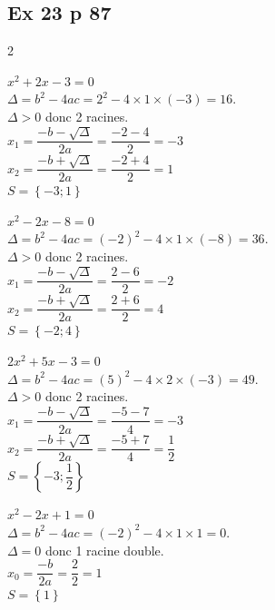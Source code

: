 \documentclass[12pt,a4paper]{book}
\begin{document}
\subsection*{Ex 23 p 87}
\begin{multicols}{2}
\begin{enumMet}
    \item $x^2+2x-3=0$\\
    $\Delta=b^2-4ac=2^2-4\times1\times(-3)=16$.\\
    $\Delta>0$ donc 2 racines.\\
    $x_1=\dfrac{-b-\sqrt{\Delta}}{2a}=\dfrac{-2-4}{2}=-3$\\
    $x_2=\dfrac{-b+\sqrt{\Delta}}{2a}=\dfrac{-2+4}{2}=1$\\
    $S=\left\{-3;1\right\}$
    \item $x^2-2x-8=0$\\
    $\Delta=b^2-4ac=(-2)^2-4\times1\times(-8)=36$.\\
    $\Delta>0$ donc 2 racines.\\
    $x_1=\dfrac{-b-\sqrt{\Delta}}{2a}=\dfrac{2-6}{2}=-2$\\
    $x_2=\dfrac{-b+\sqrt{\Delta}}{2a}=\dfrac{2+6}{2}=4$\\
    $S=\left\{-2;4\right\}$
    
    \columnbreak
    \item $2x^2+5x-3=0$\\
    $\Delta=b^2-4ac=(5)^2-4\times2\times(-3)=49$.\\
    $\Delta>0$ donc 2 racines.\\
    $x_1=\dfrac{-b-\sqrt{\Delta}}{2a}=\dfrac{-5-7}{4}=-3$\\
    $x_2=\dfrac{-b+\sqrt{\Delta}}{2a}=\dfrac{-5+7}{4}=\dfrac{1}{2}$\\
    $S=\left\{-3;\dfrac{1}{2}\right\}$
    \item $x^2-2x+1=0$\\
    $\Delta=b^2-4ac=(-2)^2-4\times1\times1=0$.\\
    $\Delta=0$ donc 1 racine double.\\
    $x_0=\dfrac{-b}{2a}=\dfrac{2}{2}=1$\\
    $S=\left\{1\right\}$
\end{enumMet}
\end{multicols}

\newpage
\end{document}
